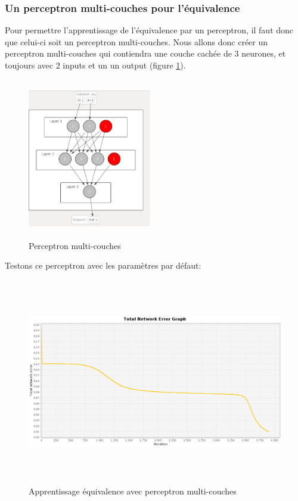 \documentclass[twoside,openright,a4paper,11pt,french]{article}
\begin{document}
\clearpage


\subsubsection{Un perceptron multi-couches pour l'équivalence}

Pour permettre l'apprentissage de l'équivalence par un perceptron, il faut donc que
celui-ci soit un perceptron multi-couches.
Nous allons donc créer un perceptron multi-couches qui contiendra une couche cachée de
3 neurones, et toujours avec 2 inputs et un un output (figure \ref{fig:eqmq}).

\begin{figure}[ht]
\centering
\includegraphics[width=5.4cm,height=7cm]{./pics/eq/perceptron_multi.eps}
\caption{Perceptron multi-couches}
\label{fig:eqmq}
\end{figure}

Testons ce perceptron avec les paramètres par défaut:

\begin{figure}[ht]
\centering
\includegraphics[width=12cm,height=9cm]{./pics/eq/multi_eq_def.eps}
\caption{Apprentissage équivalence avec perceptron multi-couches}
\end{figure}
\end{document}
